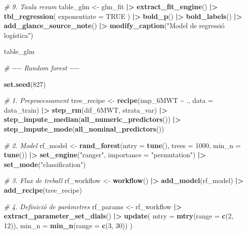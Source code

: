 \documentclass[CAT]{TFUOC}%
\newenvironment{Shaded}{\begin{snugshade}}{\end{snugshade}}
\newcommand{\AttributeTok}[1]{\textcolor[rgb]{0.13,0.29,0.53}{#1}}
\newcommand{\CommentTok}[1]{\textcolor[rgb]{0.56,0.35,0.01}{\textit{#1}}}
\newcommand{\ConstantTok}[1]{\textcolor[rgb]{0.56,0.35,0.01}{#1}}
\newcommand{\DecValTok}[1]{\textcolor[rgb]{0.00,0.00,0.81}{#1}}
\newcommand{\FunctionTok}[1]{\textcolor[rgb]{0.13,0.29,0.53}{\textbf{#1}}}
\newcommand{\NormalTok}[1]{#1}
\newcommand{\OtherTok}[1]{\textcolor[rgb]{0.56,0.35,0.01}{#1}}
\newcommand{\SpecialCharTok}[1]{\textcolor[rgb]{0.81,0.36,0.00}{\textbf{#1}}}
\newcommand{\StringTok}[1]{\textcolor[rgb]{0.31,0.60,0.02}{#1}}
\begin{document}
\begin{Shaded}
\begin{Highlighting}[]
\CommentTok{\# 9. Taula resum}
\NormalTok{table\_glm }\OtherTok{\textless{}{-}}\NormalTok{ glm\_fit }\SpecialCharTok{|\textgreater{}} 
  \FunctionTok{extract\_fit\_engine}\NormalTok{() }\SpecialCharTok{|\textgreater{}} 
  \FunctionTok{tbl\_regression}\NormalTok{(}
    \AttributeTok{exponentiate =} \ConstantTok{TRUE}
\NormalTok{  ) }\SpecialCharTok{|\textgreater{}} 
  \FunctionTok{bold\_p}\NormalTok{() }\SpecialCharTok{|\textgreater{}} 
  \FunctionTok{bold\_labels}\NormalTok{() }\SpecialCharTok{|\textgreater{}} 
  \FunctionTok{add\_glance\_source\_note}\NormalTok{() }\SpecialCharTok{|\textgreater{}} 
  \FunctionTok{modify\_caption}\NormalTok{(}\StringTok{"Model de regressió logística"}\NormalTok{)}

\NormalTok{table\_glm}

\CommentTok{\# {-}{-}{-}{-} Random forest {-}{-}{-}{-}}

\FunctionTok{set.seed}\NormalTok{(}\DecValTok{827}\NormalTok{)}

\CommentTok{\# 1. Preprocessament}
\NormalTok{tree\_recipe }\OtherTok{\textless{}{-}} \FunctionTok{recipe}\NormalTok{(imp\_6MWT }\SpecialCharTok{\textasciitilde{}}\NormalTok{ ., }\AttributeTok{data =}\NormalTok{ data\_train) }\SpecialCharTok{|\textgreater{}} 
  \FunctionTok{step\_rm}\NormalTok{(dif\_6MWT, strata\_var) }\SpecialCharTok{|\textgreater{}} 
  \FunctionTok{step\_impute\_median}\NormalTok{(}\FunctionTok{all\_numeric\_predictors}\NormalTok{()) }\SpecialCharTok{|\textgreater{}} 
  \FunctionTok{step\_impute\_mode}\NormalTok{(}\FunctionTok{all\_nominal\_predictors}\NormalTok{())}

\CommentTok{\# 2. Model}
\NormalTok{rf\_model }\OtherTok{\textless{}{-}} \FunctionTok{rand\_forest}\NormalTok{(}\AttributeTok{mtry =} \FunctionTok{tune}\NormalTok{(), }\AttributeTok{trees =} \DecValTok{1000}\NormalTok{, }\AttributeTok{min\_n =} \FunctionTok{tune}\NormalTok{()) }\SpecialCharTok{|\textgreater{}} 
  \FunctionTok{set\_engine}\NormalTok{(}\StringTok{"ranger"}\NormalTok{, }\AttributeTok{importance =} \StringTok{"permutation"}\NormalTok{) }\SpecialCharTok{|\textgreater{}} 
  \FunctionTok{set\_mode}\NormalTok{(}\StringTok{"classification"}\NormalTok{)}

\CommentTok{\# 3. Flux de treball}
\NormalTok{rf\_workflow }\OtherTok{\textless{}{-}} \FunctionTok{workflow}\NormalTok{() }\SpecialCharTok{|\textgreater{}} 
  \FunctionTok{add\_model}\NormalTok{(rf\_model) }\SpecialCharTok{|\textgreater{}} 
  \FunctionTok{add\_recipe}\NormalTok{(tree\_recipe)}

\CommentTok{\# 4. Definició de paràmetres}
\NormalTok{rf\_params }\OtherTok{\textless{}{-}}\NormalTok{ rf\_workflow }\SpecialCharTok{|\textgreater{}} 
  \FunctionTok{extract\_parameter\_set\_dials}\NormalTok{() }\SpecialCharTok{|\textgreater{}} 
  \FunctionTok{update}\NormalTok{(}
    \AttributeTok{mtry =} \FunctionTok{mtry}\NormalTok{(}\AttributeTok{range =} \FunctionTok{c}\NormalTok{(}\DecValTok{2}\NormalTok{, }\DecValTok{12}\NormalTok{)), }
    \AttributeTok{min\_n =} \FunctionTok{min\_n}\NormalTok{(}\AttributeTok{range =} \FunctionTok{c}\NormalTok{(}\DecValTok{3}\NormalTok{, }\DecValTok{30}\NormalTok{))}
\NormalTok{  )}


\end{Highlighting}
\end{Shaded}
\end{document}
